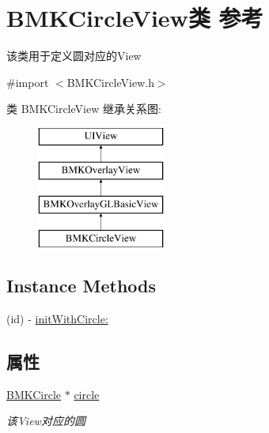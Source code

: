 \hypertarget{interface_b_m_k_circle_view}{\section{B\+M\+K\+Circle\+View类 参考}
\label{interface_b_m_k_circle_view}
}


该类用于定义圆对应的\+View  




{\ttfamily \#import $<$B\+M\+K\+Circle\+View.\+h$>$}

类 B\+M\+K\+Circle\+View 继承关系图\+:\begin{figure}[H]
\begin{center}
\leavevmode
\includegraphics[height=4.000000cm]{interface_b_m_k_circle_view}
\end{center}
\end{figure}
\subsection*{Instance Methods}
\begin{DoxyCompactItemize}
\item 
(id) -\/ \hyperlink{interface_b_m_k_circle_view_a35f06526cf5423a39d434edc0517d34e}{init\+With\+Circle\+:}
\end{DoxyCompactItemize}
\subsection*{属性}
\begin{DoxyCompactItemize}
\item 
\hypertarget{interface_b_m_k_circle_view_a07fe8c131d40bb225849dbc9bfb17e18}{\hyperlink{interface_b_m_k_circle}{B\+M\+K\+Circle} $\ast$ \hyperlink{interface_b_m_k_circle_view_a07fe8c131d40bb225849dbc9bfb17e18}{circle}}\label{interface_b_m_k_circle_view_a07fe8c131d40bb225849dbc9bfb17e18}

\begin{DoxyCompactList}\small\item\em 该\+View对应的圆 \end{DoxyCompactList}\end{DoxyCompactItemize}
